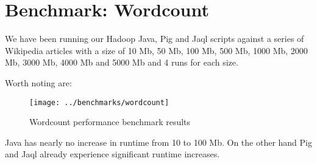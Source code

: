 \section{Benchmark: Wordcount}            

We have been running our Hadoop Java, Pig and Jaql scripts against a series of Wikipedia articles with a size of 10 Mb, 50 Mb, 100 Mb, 500 Mb, 1000 Mb, 2000 Mb, 3000 Mb, 4000 Mb and 5000 Mb and 4 runs for each size.


Worth noting are:

\begin{figure}[H]
  \begin{center}
    \texttt{[image: ../benchmarks/wordcount]}
  \end{center}
  \caption{Wordcount performance benchmark results}
  \label{fig:reducers}
\end{figure}

Java has nearly no increase in runtime from 10 to 100 Mb. On the other hand Pig and Jaql already experience significant runtime increases.